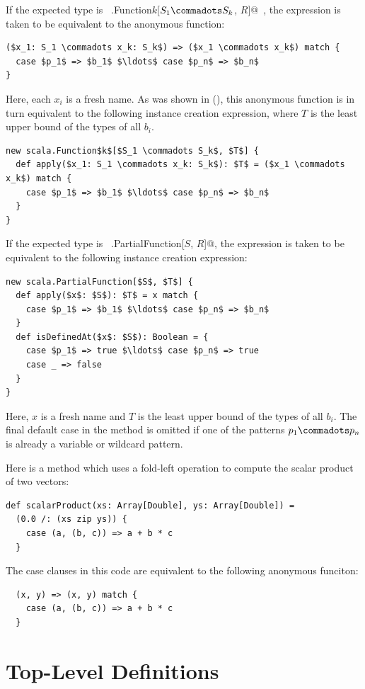 If the expected type is ~\lstinline@scala.Function$k$[$S_1 \commadots S_k$, $R$]@~,
the expression is taken to be equivalent to the anonymous function:
\begin{lstlisting}
($x_1: S_1 \commadots x_k: S_k$) => ($x_1 \commadots x_k$) match { 
  case $p_1$ => $b_1$ $\ldots$ case $p_n$ => $b_n$ 
}
\end{lstlisting}
Here, each $x_i$ is a fresh name.
As was shown in (), this anonymous function is in turn
equivalent to the following instance creation expression, where
 $T$ is the least upper bound of the types of all $b_i$.
\begin{lstlisting}
new scala.Function$k$[$S_1 \commadots S_k$, $T$] {
  def apply($x_1: S_1 \commadots x_k: S_k$): $T$ = ($x_1 \commadots x_k$) match {
    case $p_1$ => $b_1$ $\ldots$ case $p_n$ => $b_n$
  }
}
\end{lstlisting}
If the expected type is ~\lstinline@scala.PartialFunction[$S$, $R$]@,
the expression is taken to be equivalent to the following instance creation expression:
\begin{lstlisting}
new scala.PartialFunction[$S$, $T$] {
  def apply($x$: $S$): $T$ = x match {
    case $p_1$ => $b_1$ $\ldots$ case $p_n$ => $b_n$
  }
  def isDefinedAt($x$: $S$): Boolean = {
    case $p_1$ => true $\ldots$ case $p_n$ => true
    case _ => false
  }
}
\end{lstlisting}
Here, $x$ is a fresh name and $T$ is the least upper bound of the
types of all $b_i$. The final default case in the 
method is omitted if one of the patterns $p_1 \commadots p_n$ is
already a variable or wildcard pattern.

\example Here is a method which uses a fold-left operation
\code{/:} to compute the scalar product of 
two vectors:
\begin{lstlisting}
def scalarProduct(xs: Array[Double], ys: Array[Double]) = 
  (0.0 /: (xs zip ys)) {
    case (a, (b, c)) => a + b * c
  }
\end{lstlisting}
The case clauses in this code are equivalent to the following
anonymous funciton:
\begin{lstlisting}
  (x, y) => (x, y) match {
    case (a, (b, c)) => a + b * c
  }
\end{lstlisting}

\chapter{Top-Level Definitions}
\label{sec:topdefs}

